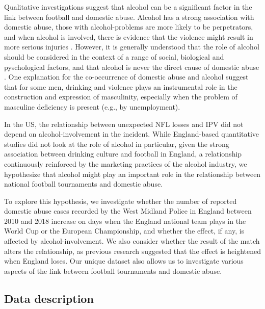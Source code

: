 \documentclass[12pt, letterpaper]{article}
\begin{document}
Qualitative investigations suggest that alcohol can be a significant factor in the link between football and domestic abuse. Alcohol has a strong association with domestic abuse, those with alcohol-problems are more likely to be perpetrators, and when alcohol is involved, there is evidence that the violence might result in more serious injuries \autocite{Peralta2010}. However, it is generally understood that the role of alcohol should be considered in the context of a range of social, biological and pyschological factors, and that alcohol is never the direct cause of domestic abuse \autocite{Javaid2015,Peralta2010}. One explanation for the co-occurrence of domestic abuse and alcohol suggest that for some men, drinking and violence plays an instrumental role in the construction and expression of masculinity, especially when the problem of masculine deficiency is present (e.g., by unemployment)\autocite{Peralta2010}. 

In the US, the relationship between unexpected NFL losses and IPV did not depend on alcohol-involvement in the incident\autocite{Card2011}. While England-based quantitative studies did not look at the role of alcohol in particular, given the strong association between drinking culture and football in England\autocite{Dixon2014}, a relationship continuously reinforced by the marketing practices of the alcohol industry\autocite{Gornall2014}, we hypothesize that alcohol might play an important role in the relationship between national football tournaments and domestic abuse.

To explore this hypothesis, we investigate whether the number of reported domestic abuse cases recorded by the West Midland Police in England between 2010 and 2018 increase on days when the England national team plays in the World Cup or the European Championship, and whether the effect, if any, is affected by alcohol-involvement. We also consider whether the result of the match alters the relationship, as previous research suggested that the effect is heightened when England loses\autocite{Kirby2014}. Our unique dataset also allows us to investigate various aspects of the link between football tournaments and domestic abuse.


\newpage

\subsection{Data description}
\end{document}
